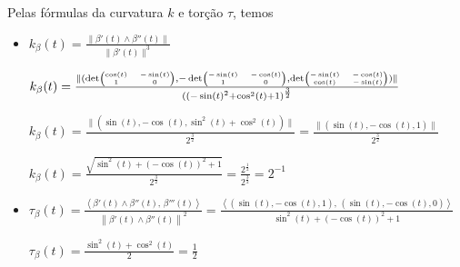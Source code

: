 \documentclass[../main.tex]{subfiles}
\begin{document}
\begin{solucao}
\begin{enumerate}[label=\alph*)]
		Pelas fórmulas da curvatura $k$ e torção $\tau$, temos
		
		\begin{itemize}
			\item $k_\beta(t)=\frac{\|\beta'(t) \wedge \beta''(t)\|}{\|\beta'(t)\|^3}$
			
			{\scriptsize
				$k_\beta(t)=\frac{\|(\det \tiny\begin{pmatrix} \cos(t)&-\sin(t)\\1 &0 \end{pmatrix},-\det\tiny\begin{pmatrix} -\sin(t)&-\cos(t)\\1 &0 \end{pmatrix}, \det\tiny\begin{pmatrix} -\sin(t)&-\cos(t)\\\cos(t) &-\sin(t) \end{pmatrix})\|}{((-\sin(t)^2+\cos^2(t)+1)^{\frac{3}{2}}}$
			}
			
			$k_\beta(t)=\frac{\|(\sin(t), -\cos(t), \sin^2(t)+\cos^2(t))\|}{2^{\frac{3}{2}}}=\frac{\|(\sin(t), -\cos(t), 1)\|}{2^\frac{3}{2}}$
			
			$k_\beta(t)=\frac{\sqrt{\sin^2(t)+(-\cos(t))^2+1}}{2^{\frac{3}{2}}}=\frac{2^{\frac{1}{2}}}{2^{\frac{3}{2}}}=2^{-1}$
			\item $\tau_\beta(t)=\frac{\left\langle \beta'(t) \wedge \beta''(t), \, \beta'''(t) \right\rangle}{\left\|\beta'(t) \wedge \beta''(t)\right\|^2}=\frac{\left\langle (\sin(t),-\cos(t), 1),\, (\sin(t),-\cos(t),0) \right\rangle}{ \sin^2(t)+(-\cos(t))^2+1}$
			
			$\tau_\beta{(t)=\frac{\sin^2(t)+\cos^2(t)}{2}}=\frac{1}{2}$
		\end{itemize}
	\end{enumerate}
\end{solucao}
\end{document}
